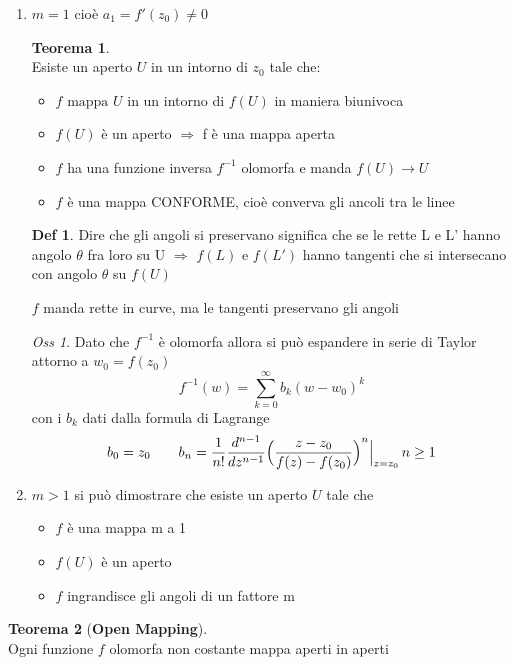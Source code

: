 \documentclass[a4paper,11pt]{report}
\theoremstyle{remark}
\newtheorem*{oss}{Oss}
\theoremstyle{definition}
\newtheorem*{teo}{Teorema}
\newtheorem*{Def}{Def}
\begin{document}
	\begin{enumerate}
		\item $m=1$ \quad cioè \quad $a_1=f'(z_0)\neq0$
		
		\begin{teo}\hfil\\
			Esiste un aperto $U$ in un intorno di $z_0$ tale che:
			\begin{itemize}
				\item $f \text{ mappa } U$ in un intorno di $f(U)$ in maniera biunivoca
				\item $f(U)$ è un aperto $\Rightarrow$ f è una mappa aperta
				\item $f$ ha una funzione inversa $f^{-1}$ olomorfa e manda $f(U) \rightarrow U$
				\item $f$ è una mappa CONFORME, cioè converva gli ancoli tra le linee
			\end{itemize}
		\end{teo}
	
		\begin{Def}
			Dire che gli angoli si preservano significa che se le rette L e L' hanno angolo $\theta$ fra loro su U $\Rightarrow$ $f(L)$ e $f(L')$ hanno tangenti che si intersecano con angolo $\theta$ su $f(U)$ 
		\end{Def}
	
		$f$ manda rette in curve, ma le tangenti preservano gli angoli
		
		\begin{oss}
			Dato che $f^{-1}$ è olomorfa allora si può espandere in serie di Taylor attorno a $w_0=f(z_0)$
			\[f^{-1}(w) = \sum_{k=0}^{\infty} b_k (w-w_0)^k\]
			con i $b_k$ dati dalla formula di Lagrange
			\[b_0 = z_0 \qquad b_n = \frac{1}{n!} \frac{d^{n-1}}{dz^{n-1}} {\Bigl(\frac{z-z_0}{f(z)-f(z_0)}\Bigr)}^n \Bigr|_{z=z_0} \, n\geq 1\]
		\end{oss}
	
		\item $m>1$ si può dimostrare che esiste un aperto $U$ tale che 
		\begin{itemize}
			\item $f$ è una mappa m a 1 
			\item $f(U)$ è un aperto
			\item $f$ ingrandisce gli angoli di un fattore m
		\end{itemize}
	
	\end{enumerate}

	\begin{teo}[\textbf{Open Mapping}]\hfil\\
		Ogni funzione $f$ olomorfa non costante mappa aperti in aperti
	\end{teo}
\end{document}
